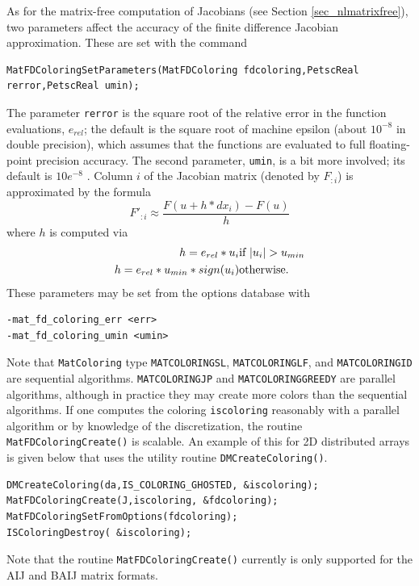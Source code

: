 As for the matrix-free computation of Jacobians (see Section
\ref{sec_nlmatrixfree}), two parameters affect the accuracy of the
finite difference Jacobian approximation.  These are set with the command
\begin{lstlisting}
MatFDColoringSetParameters(MatFDColoring fdcoloring,PetscReal rerror,PetscReal umin);
\end{lstlisting}
The parameter \lstinline{rerror} is the square root of
the relative error in the function evaluations, $e_{rel}$; the default is the square root of machine epsilon (about $10^{-8}$ in double precision), which assumes 
that the functions are evaluated to full floating-point precision accuracy. The
second parameter, \lstinline{umin}, is a bit more involved; its default is
$ 10e^{-8} $ .  Column $i$ of the Jacobian matrix (denoted by $F_{:i}$) is
approximated by the formula
\[
    F'_{:i} \approx \frac{F(u + h*dx_{i}) - F(u)}{h}
\]
where $ h $ is computed via
\begin{eqnarray*}
        h = e_{rel}*u_{i}             &    \hbox{if }  |u_{i}| > u_{min} \\
        h = e_{rel}*u_{min}*sign(u_{i})  &    \hbox{otherwise}.
\end{eqnarray*}
These parameters may be set from the options database with
\begin{lstlisting}
-mat_fd_coloring_err <err>
-mat_fd_coloring_umin <umin>
\end{lstlisting}
 

Note that \lstinline{MatColoring} type \lstinline{MATCOLORINGSL}, \lstinline{MATCOLORINGLF}, and \lstinline{MATCOLORINGID} are sequential algorithms.  \lstinline{MATCOLORINGJP} and
\lstinline{MATCOLORINGGREEDY} are parallel algorithms, although in practice they may create more colors than the sequential
algorithms.  If one computes the coloring \lstinline{iscoloring} reasonably with a parallel algorithm or by knowledge of the
discretization, the routine \lstinline{MatFDColoringCreate()} is scalable.  An example of this for 2D distributed arrays is given
below that uses the utility routine \lstinline{DMCreateColoring()}.

\begin{lstlisting}
DMCreateColoring(da,IS_COLORING_GHOSTED, &iscoloring);
MatFDColoringCreate(J,iscoloring, &fdcoloring); 
MatFDColoringSetFromOptions(fdcoloring);
ISColoringDestroy( &iscoloring);
\end{lstlisting}

Note that the routine \lstinline{MatFDColoringCreate()} currently is only supported for the AIJ and BAIJ matrix formats.

